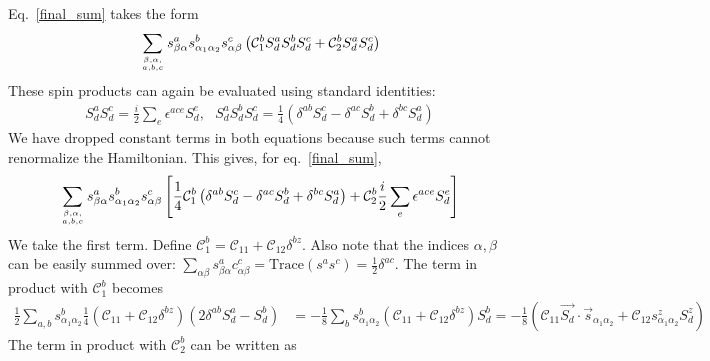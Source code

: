 \documentclass{revtex4-2}
\numberwithin{equation}{section}
\begin{document}
Eq.~\ref{final_sum} takes the form
\begin{equation}\begin{aligned}
	\sum_{\beta,\alpha, \atop{a,b,c}}s^a_{\beta \alpha} s^b_{\alpha_1 \alpha_2}s^c_{\alpha \beta}\left(\mathcal{C}_1^b S_d^a S_d^b S_d^c+ \mathcal{C}_2^b S_d^a S_d^c\right)  
\end{aligned}\end{equation}
These spin products can again be evaluated using standard identities:
\begin{equation}\begin{aligned}
	S_d^a S_d^c = \frac{i}{2}\sum_{e}\epsilon^{ace}S_d^e, ~ ~ ~ S_d^a S_d^b S_d^c = \frac{1}{4}\left(\delta^{ab}S_d^c - \delta^{ac}S_d^b + \delta^{bc}S_d^a\right) 
\end{aligned}\end{equation}
We have dropped constant terms in both equations because such terms cannot renormalize the Hamiltonian. This gives, for eq.~\ref{final_sum},
\begin{equation}\begin{aligned}
	\label{Cb1Cb2}
	\sum_{\beta,\alpha, \atop{a,b,c}}s^a_{\beta \alpha} s^b_{\alpha_1 \alpha_2}s^c_{\alpha \beta}\left[\frac{1}{4}\mathcal{C}_1^b \left(\delta^{ab}S_d^c - \delta^{ac}S_d^b + \delta^{bc}S_d^a\right)+ \mathcal{C}_2^b \frac{i}{2}\sum_{e}\epsilon^{ace}S_d^e\right]
\end{aligned}\end{equation}
We take the first term. Define \(\mathcal{C}^b_1 = \mathcal{C}_{11} + \mathcal{C}_{12}\delta^{bz}\). Also note that the indices \(\alpha,\beta\) can be easily summed over: \(\sum_{\alpha\beta}s^a_{\beta\alpha}c^c_{\alpha\beta} = \text{Trace}\left(s^a s^c\right) = \frac{1}{2}\delta^{ac}\). The term in product with \(\mathcal{C}^b_1\) becomes
\begin{equation}\begin{aligned}
	\label{Cb1}
	\frac{1}{2}\sum_{a,b}s^b_{\alpha_1 \alpha_2}\frac{1}{4}\left(\mathcal{C}_{11} + \mathcal{C}_{12}\delta^{bz}\right) \left(2\delta^{ab}S_d^a - S_d^b\right) &= -\frac{1}{8}\sum_{b}s^b_{\alpha_1 \alpha_2}\left(\mathcal{C}_{11} + \mathcal{C}_{12}\delta^{bz}\right)S_d^b = -\frac{1}{8}\left(\mathcal{C}_{11} \vec{S_d}\cdot\vec{s}_{\alpha_1\alpha_2} + \mathcal{C}_{12}s^z_{\alpha_1\alpha_2}S_d^z\right)
\end{aligned}\end{equation}
The term in product with \(\mathcal{C}^b_2\) can be written as
\end{document}
